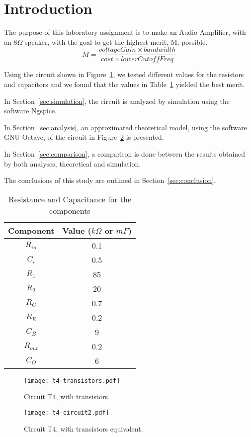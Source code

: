 \section{Introduction}
\label{sec:introduction}

The purpose of this laboratory assignment is to make an Audio Amplifier, with an $8\Omega$ speaker, with the goal to get the highest merit, M, possible.
$$ M = \frac{voltageGain \times bandwidth}{cost \times lowerCutoffFreq}$$

Using the circuit shown in Figure~\ref{fig:t4-transistors}, we tested different values for the resistors and capacitors and we found that the values in Table~\ref{tab:values} yielded the best merit.

In Section~\ref{sec:simulation}, the circuit is analyzed by simulation using the software Ngspice. 

In Section~\ref{sec:analysis}, an approximated theoretical model, using the software GNU Octave, of the circuit in Figure~\ref{fig:t4-equiv} is presented. 

In Section~\ref{sec:comparison}, a comparison is done between the results obtained by both analyses, theoretical and simulation.

The conclusions of this study are outlined in Section~\ref{sec:conclusion}.

\begin{table}[ht!]
    \centering
    \begin{tabular}{c c}
    \toprule
    Component & Value ($k\Omega$ or $mF$) \\ \midrule
    $R_{in}$  & 0.1 \\
    $C_i$     & 0.5 \\
    $R_1$     & 85  \\
    $R_2$     & 20  \\
    $R_C$     & 0.7   \\
    $R_E$     & 0.2 \\
    $C_B$     & 9   \\
    $R_{out}$ & 0.2 \\
    $C_O$     & 6   \\
    \end{tabular}
    \label{tab:values}
    \caption{Resistance and Capacitance for the components}
\end{table}


\begin{figure}[ht!]
\centering
    \texttt{[image: t4-transistors.pdf]}
\caption{Circuit T4, with transistors.}
\label{fig:t4-transistors}
\end{figure}

\begin{figure}[ht!]
\centering
    \texttt{[image: t4-circuit2.pdf]}
\caption{Circuit T4, with transistors equivalent.}
\label{fig:t4-equiv}
\end{figure}

\FloatBarrier
\clearpage

